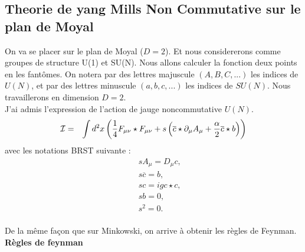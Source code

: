 \documentclass[a4paper,11pt]{article} %
\theoremstyle{plain}
\theoremstyle{definition}
\theoremstyle{remark}
\numberwithin{equation}{section}
\numberwithin{equation}{subsection}
\numberwithin{figure}{section}
\begin{document}
  \subsection{Theorie de yang Mills Non Commutative sur le plan de Moyal}

\noindent
On va se placer sur le plan de Moyal ($D=2$). Et nous considererons comme groupes de structure U(1) et SU(N).
\noindent
Nous allons calculer la fonction deux points en les fantômes. On notera par des lettres majuscule $(A,B,C,...)$ les indices de $U(N)$, 
et par des lettres minuscule $(a,b,c,...)$ les indices de $SU(N)$. Nous travaillerons en dimension $D=2$.\\

\noindent
J'ai admis l'expression de l'action de jauge noncommutative $U(N)$.
\begin{eqnarray*}
 \cal{I}  &=&  \int d^{2 } x  \left(  \frac{1}{4}  F_{\mu  \nu}  \star  F_{\mu  \nu}  + s \left( \overline{c} \star \partial_{\mu} A_{\mu}   
+  \frac{\alpha}{2} \overline{c} \star b \right)  \right)
\end{eqnarray*}
avec les notations BRST suivante :
\begin{eqnarray*}
 &&s A_{\mu}  = D_ {\mu} c,  \\
 &&s \overline{c} = b,  \\
 &&s c = i g c\star c,  \\
 &&sb = 0,\\
 &&s^{2} = 0.
\end{eqnarray*}\\

\noindent
De la même façon que sur Minkowski, on arrive à obtenir les règles de Feynman.\\
\textbf{Règles de feynman}\\
\end{document}

